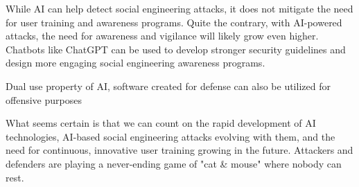 While AI can help detect social engineering attacks, it does not mitigate the need for user training and awareness programs. Quite the contrary, with AI-powered attacks, the need for awareness and vigilance will likely grow even higher. Chatbots like ChatGPT can be used to develop stronger security guidelines and design more engaging social engineering awareness programs.

Dual use property of AI, software created for defense can also be utilized for offensive purposes \citep{blauthArtificialIntelligenceCrime2022}

What seems certain is that we can count on the rapid development of AI technologies, AI-based social engineering attacks evolving with them, and the need for continuous, innovative user training growing in the future. Attackers and defenders are playing a never-ending game of "cat \& mouse" where nobody can rest.